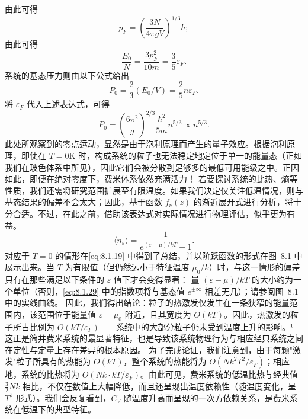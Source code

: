 由此可得
\begin{equation}\tag{8.1.23}\label{eq:8.1.23}
p _ { F } = \left( \frac { 3 N } { 4 \pi g V } \right) ^{1 / 3} h ;
\end{equation}
由此可得
\begin{equation}\tag{8.1.24}\label{eq:8.1.24}
\frac { E _ { 0 } } { N } = \frac { 3 p _ { F } ^{2} } { 10 m } = \frac { 3 } { 5 } \varepsilon _ { F } .
\end{equation}
系统的基态压力则由以下公式给出
\begin{equation}\tag{8.1.25}\label{eq:8.1.25}
P _ { 0 } = \frac { 2 } { 3 } ( E _ { 0 } / V ) = \frac { 2 } { 5 } n \varepsilon _ { F } .
\end{equation}
将 \(\varepsilon_{F}\) 代入上述表达式，可得
\begin{equation}\tag{8.1.26}\label{eq:8.1.26}
P _ { 0 } = \left( \frac { 6 \pi ^{2} } { g } \right) ^{2 / 3} \frac { \hbar ^{2} } { 5 m } n ^{5 / 3} \propto n ^{5 / 3} .
\end{equation}
此处所观察到的零点运动，显然是由于泡利原理而产生的量子效应。根据泡利原理，即使在 \(T=0\)K 时，构成系统的粒子也无法稳定地定位于单一的能量态（正如我们在玻色体系中所见），因此它们会被分散到足够多的最低可用能级之中。正因如此，即便在绝对零度下，费米体系依然充满活力！
若要探讨系统的比热、熵等性质，我们还需将研究范围扩展至有限温度。如果我们决定仅关注低温情况，则与基态结果的偏差不会太大；因此，基于函数 \(f_{\nu}(z)\) 的渐近展开式进行分析，将十分合适。不过，在此之前，借助该表达式对实际情况进行物理评估，似乎更为有益。
\begin{equation}\tag{8.1.27}\label{eq:8.1.27}
\langle n _ { \varepsilon } \rangle = \frac { 1 } { e ^{( \varepsilon - \mu ) / k T} + 1 } .
\end{equation}
对应于 \(T=0\) 的情形在\autoref{eq:8.1.19} 中得到了总结，并以阶跃函数的形式在图~8.1 中展示出来。当 \(T\) 为有限值（但仍然远小于特征温度 \(\mu_0/k\)）时，与这一情形的偏差只有在那些满足以下条件的 \(\varepsilon\) 值下才会变得显著：
量 \((\varepsilon - \mu)/kT\) 的大小约为一个单位（否则，\autoref{eq:8.1.29} 中的指数项将与基态值 \(e^{\pm\infty}\) 相差无几）；请参阅图~8.1 中的实线曲线。
因此，我们得出结论：粒子的热激发仅发生在一条狭窄的能量范围内，该范围位于能量值 \(\varepsilon=\mu_{0}\) 附近，且其宽度为 \(O(kT)\)。因此，热激发的粒子所占比例为 \(O(kT/\varepsilon_{F})\)——系统中的大部分粒子仍未受到温度上升的影响。¹ 这正是简并费米系统的最显著特征，也是导致该系统物理行为与相应经典系统之间在定性与定量上存在差异的根本原因。
为了完成论证，我们注意到，由于每颗"激发"粒子所具有的热能为 \(O(kT)\)，整个系统的热能将为 \(O(Nk^2T^2/\varepsilon_F)\)；相应地，系统的比热将为 \(O(Nk \cdot kT/\varepsilon_F)\)。由此可见，费米系统的低温比热与经典值 \(\frac{3}{2}Nk\) 相比，不仅在数值上大幅降低，而且还呈现出温度依赖性（随温度变化，呈 \(T^1\) 形式）。我们会反复看到，\(C_V\) 随温度升高而呈现的一次方依赖关系，是费米系统在低温下的典型特征。
